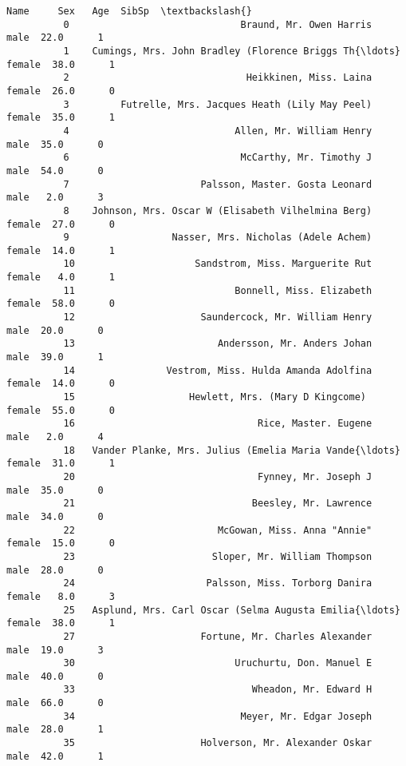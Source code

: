 \documentclass[11pt]{article}
\begin{document}
\begin{Verbatim}[commandchars=\\\{\}]
                                                            Name     Sex   Age  SibSp  \textbackslash{}
          0                              Braund, Mr. Owen Harris    male  22.0      1   
          1    Cumings, Mrs. John Bradley (Florence Briggs Th{\ldots}  female  38.0      1   
          2                               Heikkinen, Miss. Laina  female  26.0      0   
          3         Futrelle, Mrs. Jacques Heath (Lily May Peel)  female  35.0      1   
          4                             Allen, Mr. William Henry    male  35.0      0   
          6                              McCarthy, Mr. Timothy J    male  54.0      0   
          7                       Palsson, Master. Gosta Leonard    male   2.0      3   
          8    Johnson, Mrs. Oscar W (Elisabeth Vilhelmina Berg)  female  27.0      0   
          9                  Nasser, Mrs. Nicholas (Adele Achem)  female  14.0      1   
          10                     Sandstrom, Miss. Marguerite Rut  female   4.0      1   
          11                            Bonnell, Miss. Elizabeth  female  58.0      0   
          12                      Saundercock, Mr. William Henry    male  20.0      0   
          13                         Andersson, Mr. Anders Johan    male  39.0      1   
          14                Vestrom, Miss. Hulda Amanda Adolfina  female  14.0      0   
          15                    Hewlett, Mrs. (Mary D Kingcome)   female  55.0      0   
          16                                Rice, Master. Eugene    male   2.0      4   
          18   Vander Planke, Mrs. Julius (Emelia Maria Vande{\ldots}  female  31.0      1   
          20                                Fynney, Mr. Joseph J    male  35.0      0   
          21                               Beesley, Mr. Lawrence    male  34.0      0   
          22                         McGowan, Miss. Anna "Annie"  female  15.0      0   
          23                        Sloper, Mr. William Thompson    male  28.0      0   
          24                       Palsson, Miss. Torborg Danira  female   8.0      3   
          25   Asplund, Mrs. Carl Oscar (Selma Augusta Emilia{\ldots}  female  38.0      1   
          27                      Fortune, Mr. Charles Alexander    male  19.0      3   
          30                            Uruchurtu, Don. Manuel E    male  40.0      0   
          33                               Wheadon, Mr. Edward H    male  66.0      0   
          34                             Meyer, Mr. Edgar Joseph    male  28.0      1   
          35                      Holverson, Mr. Alexander Oskar    male  42.0      1   

\end{Verbatim}
\end{document}

